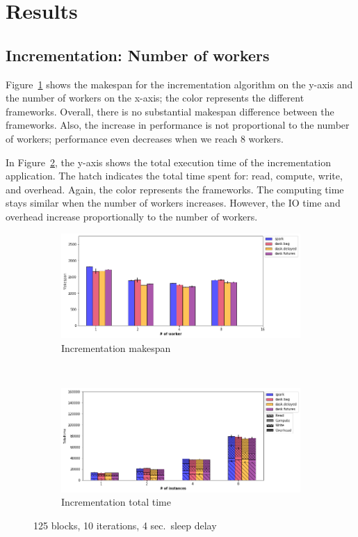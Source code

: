 \documentclass[conference]{IEEEtran}
\begin{document}
\section{Results}

\subsection{Incrementation: Number of workers}
Figure~\ref{fig:inc_ms_worker} shows the makespan for the incrementation algorithm on
the y-axis and the number of workers on the x-axis; the color represents the
different frameworks. Overall, there is no substantial makespan difference between
the frameworks. Also, the increase in performance is not proportional to the number
of workers; performance even decreases when we reach 8 workers.

In Figure~\ref{fig:inc_tt_worker}, the y-axis shows the total execution time of the
incrementation application. The hatch indicates the total time spent for: read,
compute, write, and overhead. Again, the color represents the frameworks. The
computing time stays similar when the number of workers increases. However, the IO
time and overhead increase proportionally to the number of workers.

\begin{figure}[!b]
    \centering
    \begin{subfigure}[b]{\columnwidth}
        \includegraphics[clip,width=\columnwidth]{images/inc_worker.png}%
        \caption{Incrementation makespan}\label{fig:inc_ms_worker}
    \end{subfigure}
    \\
    \begin{subfigure}[b]{\columnwidth}
        \includegraphics[clip,width=\columnwidth]{images/inc_idle_worker.png}%
        \caption{Incrementation total time}\label{fig:inc_tt_worker}
    \end{subfigure}
    \caption{125 blocks, 10 iterations, 4 sec.\ sleep delay}\label{fig:inc_worker}
\end{figure}
\end{document}
